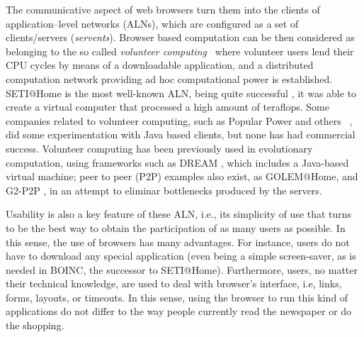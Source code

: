 \documentclass[runningheads,a4paper]{llncs}
\begin{document}
The communicative aspect of web browsers turn them into the clients of application--level networks (ALNs), which are configured as a set of
clients/servers ({\em servents}). Browser based computation can be then considered as belonging to the so called  {\em volunteer computing}~\cite{sarmenta-bayanihan,hpvc} where volunteer users lend their CPU cycles by means of a downloadable application, and a distributed computation network providing ad hoc computational power is established. SETI@Home is the most well-known ALN, being quite successful \cite{david-seti:home}, it was able to	
create a virtual computer that processed a high amount of
teraflops.  Some companies related to volunteer computing, such as Popular Power and
others ~\cite{Cappello}, did some experimentation with Java based
clients, but none has had commercial success. Volunteer computing has
been previously used in evolutionary computation, using
frameworks such as DREAM \cite{LNCS2439:ID197:pp665}, which includes a
Java-based virtual machine; peer to peer (P2P) examples also exist, as  GOLEM@Home, and G2-P2P \cite{G2-P2P}, in an attempt to eliminar bottlenecks produced by the servers.


Usability is also a key feature of these ALN, i.e., its simplicity
of use that turns to be the best way to obtain the participation of as
many users as possible. In this sense, the use of browsers has many advantages. For instance, users do not have to download any special application (even being a simple screen-saver, as is needed in BOINC, the successor to SETI@Home). Furthermore, users, no matter their technical knowledge, are used to deal with browser's interface, i.e, links, forms, layouts, or timeouts. In this sense, using the browser to run this kind of applications do not differ to the way people currently read the newspaper or do the shopping.
\end{document}
